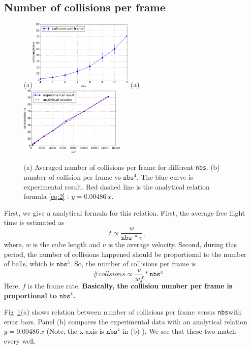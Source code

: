 \documentclass[twoside,11pt]{article}
\newcommand{\nbs}{\texttt{nbs}}
\begin{document}
\subsection{Number of collisions per frame}
\begin{figure}[h]
  \centering
  (a)\includegraphics[width=0.46\textwidth]{collision}
  (a)\includegraphics[width=0.46\textwidth]{analytic}
  \caption{
    (a) Averaged number of collisions per frame for different \nbs.
    (b) number of collision per frame vs $\nbs^4$. The blue curve is
    experimental result. Red dashed line is the analytical relation
    formula \eqref{eq:2} : $ y = 0.00486 \, x$.
  }
  \label{fig:collision}
\end{figure}
First, we give a analytical formula for this 
relation. First, the average free flight time is estimated as 
\begin{equation}
  \label{eq:1}
  t \propto \frac{w}{\nbs\, * v} \,,
\end{equation}
where, $w$ is the cube length and $v$ is the average velocity.
Second, during this period, the number of collisions happened should 
be proportional to the number of balls, which is $\nbs^3$. So, the 
number of collisions per frame is 
\begin{equation}
  \label{eq:2}
  \# collsions \propto \frac{v}{wf} * \nbs^4
\end{equation}
Here, $f$ is the frame rate. 
\textbf{Basically, the collision number per frame is
proportional to $\nbs^4$.}

Fig~\ref{fig:collision}(a) shows relation between number of collisions 
per frame versus \nbs with error bars. Panel (b) compares the experimental
data with an analytical relation $ y = 0.00486 \, x$ (Note, the x axis is
$\nbs^4$ in (b) ). We see that these two match every well.
\end{document}
